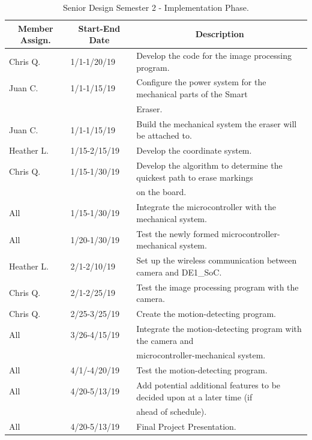 \begin{table} [H]	
	\normalsize
	\centering
	\begin{tabular}{|l|l|l|}
		\hline
		\multicolumn{1}{|c|}{\textbf{Member Assign.}} & \multicolumn{1}{|c|}{\textbf{Start-End Date}} & \multicolumn{1}{|c|}{\textbf{Description}} \\
		\hline
		Chris Q. & 1/1-1/20/19 & Develop the code for the image processing program. \\
		\hline
		Juan C. & 1/1-1/15/19 & Configure the power system for the mechanical parts of the Smart \\
		& & Eraser. \\
		\hline
		Juan C. & 1/1-1/15/19 & Build the mechanical system the eraser will be attached to.\\
		\hline
		Heather L. & 1/15-2/15/19 & Develop the coordinate system. \\
		\hline
		Chris Q. & 1/15-1/30/19 & Develop the algorithm to determine the quickest path to erase markings \\
		& & on the board.\\
		\hline
		All & 1/15-1/30/19 & Integrate the microcontroller with the mechanical system.\\
		\hline
		All & 1/20-1/30/19 & Test the newly formed microcontroller-mechanical system.\\
		\hline
		Heather L. & 2/1-2/10/19 &
		Set up the wireless communication between camera and DE1\_SoC.\\
		\hline
		Chris Q. & 2/1-2/25/19 & Test the image processing program with the camera.\\
		\hline
		Chris Q. & 2/25-3/25/19 & Create the motion-detecting program.\\
		\hline
		All & 3/26-4/15/19 & Integrate the motion-detecting program with the camera and \\
		& & microcontroller-mechanical system.\\
		\hline
		All & 4/1/-4/20/19 & Test the motion-detecting program.\\
		\hline
		All & 4/20-5/13/19 & 
		Add potential additional features to be decided upon at a later time (if \\
		& & ahead of schedule).\\
		\hline
		All & 4/20-5/13/19 & 
		Final Project Presentation.\\
		\hline
	\end{tabular} 
	\caption{Senior Design Semester 2 - Implementation Phase.}
	\label{table:4}
\end{table}

